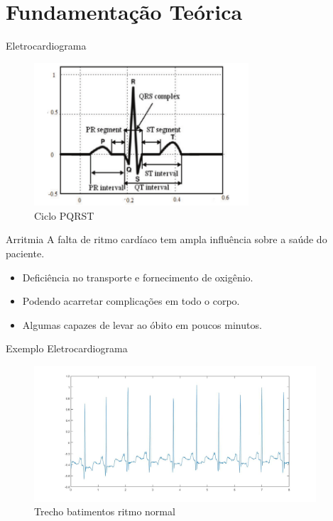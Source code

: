 \documentclass[10pt]{beamer}
\begin{document}
\section{Fundamentação Teórica}

\begin{frame}{Eletrocardiograma}
    \begin{figure}[]
      \centering
      \includegraphics[width=8cm]{images/pqrst.png}
      \caption{Ciclo PQRST \cite{faziludeen_ecg_2013}}
      \label{fig:pqrst}
    \end{figure}
\end{frame}

\begin{frame}{Arritmia}
  A falta de ritmo cardíaco tem ampla influência sobre a saúde do paciente.
    \begin{itemize}
      \item Deficiência no transporte e fornecimento de oxigênio.
      \item Podendo acarretar complicações em todo o corpo.
      \item Algumas capazes de levar ao óbito em poucos minutos.
    \end{itemize}
\end{frame}

\begin{frame}{Exemplo Eletrocardiograma}
  \begin{figure}
    \includegraphics[width=10.5cm]{images/NormalBeatSample.jpg}
    \caption{Trecho batimentos ritmo normal}
  \end{figure}

\end{frame}
\end{document}
